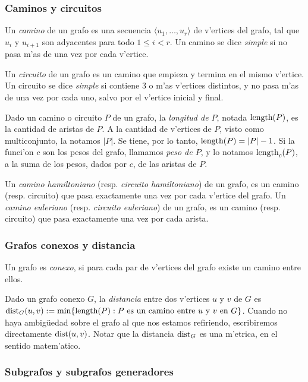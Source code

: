 \subsubsection*{Caminos y circuitos}

Un \textit{camino} de un grafo es una secuencia $\langle u_1, \dots, u_r \rangle$ de v'ertices del grafo, tal que $u_i$ y $u_{i + 1}$ son adyacentes para todo $1 \leq i < r$. Un camino se dice \textit{simple} si no pasa m'as de una vez por cada v'ertice.

Un \textit{circuito} de un grafo es un camino que empieza y termina en el mismo v'ertice. Un circuito se dice \textit{simple} si contiene 3 o m'as v'ertices distintos, y no pasa m'as de una vez por cada uno, salvo por el v'ertice inicial y final.

Dado un camino o circuito $P$ de un grafo, la \textit{longitud de $P$}, notada $\textnormal{length}(P)$, es la cantidad de aristas de $P$. A la cantidad de v'ertices de $P$, visto como multiconjunto, la notamos $|P|$. Se tiene, por lo tanto, $\textnormal{length}(P) = |P| - 1$. Si la funci'on $c$ son los pesos del grafo, llamamos \textit{peso de $P$}, y lo notamos $\textnormal{length}_c(P)$, a la suma de los pesos, dados por $c$, de las aristas de $P$.

Un \textit{camino hamiltoniano} (resp. \textit{circuito hamiltoniano}) de un grafo, es un camino (resp. circuito) que pasa exactamente una vez por cada v'ertice del grafo. Un \textit{camino euleriano} (resp. \textit{circuito euleriano}) de un grafo, es un camino (resp. circuito) que pasa exactamente una vez por cada arista.

\subsubsection*{Grafos conexos y distancia}

Un grafo es \textit{conexo}, si para cada par de v'ertices del grafo existe un camino entre ellos.

Dado un grafo conexo $G$, la \textit{distancia} entre dos v'ertices $u$ y $v$ de $G$ es $\textnormal{dist}_G(u, v) := \min\{\textnormal{length}(P): P \text{ es un camino entre }u \text{ y }v \text{ en } G\}$. Cuando no haya ambig\"uedad sobre el grafo al que nos estamos refiriendo, escribiremos directamente $\textnormal{dist}(u, v)$. Notar que la distancia $\textnormal{dist}_G$ es una m'etrica, en el sentido matem'atico.

\subsubsection*{Subgrafos y subgrafos generadores}

